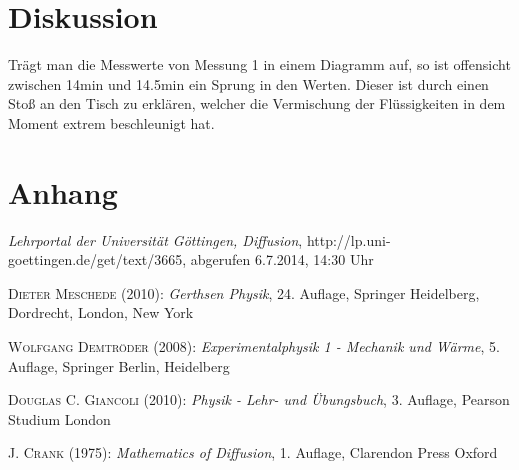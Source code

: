 \documentclass[12pt,a4paper,titlepage,headinclude,bibtotoc]{scrartcl}
\begin{document}
\section{Diskussion}
\label{sec:diskussion}
Trägt man die Messwerte von Messung 1 in einem Diagramm auf, so ist offensicht zwischen 14min und 14.5min ein Sprung in den Werten.
Dieser ist durch einen Stoß an den Tisch zu erklären, welcher die Vermischung der Flüssigkeiten in dem Moment extrem beschleunigt hat.



\section{Anhang}
\begin{thebibliography}{1000}

	\emph{Lehrportal der Universität Göttingen, Diffusion},
  http://lp.uni-goettingen.de/get/text/3665, abgerufen 6.7.2014, 14:30 Uhr

	\textsc{Dieter Meschede} (2010): \emph{Gerthsen Physik}, 24. Auflage, Springer Heidelberg,
Dordrecht, London, New York

	\textsc{Wolfgang Demtröder} (2008): \emph{Experimentalphysik 1 - Mechanik und Wärme}, 5. Auflage, Springer Berlin, Heidelberg


	\textsc{Douglas C. Giancoli} (2010): \emph{Physik - Lehr- und Übungsbuch}, 3. Auflage, Pearson Studium London

	\textsc{J. Crank} (1975): \emph{Mathematics of Diffusion}, 1. Auflage, Clarendon Press Oxford
	
\end{thebibliography}
\end{document}

